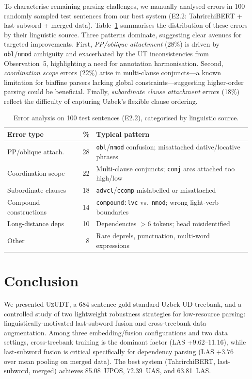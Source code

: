 \documentclass[runningheads]{llncs}
\begin{document}
To characterise remaining parsing challenges, we manually analysed errors in 100 randomly sampled test sentences from our best system (E2.2: TahrirchiBERT + last-subword + merged data). Table~\ref{tab:error_analysis} summarises the distribution of these errors by their linguistic source.
Three patterns dominate, suggesting clear avenues for targeted improvements. First, \emph{PP/oblique attachment} (28\%) is driven by \texttt{obl}/\texttt{nmod} ambiguity and exacerbated by the UT inconsistencies from Observation~5, highlighting a need for annotation harmonisation. Second, \emph{coordination scope} errors (22\%) arise in multi-clause conjuncts—a known limitation for biaffine parsers lacking global constraints—suggesting higher-order parsing could be beneficial. Finally, \emph{subordinate clause attachment} errors (18\%) reflect the difficulty of capturing Uzbek's flexible clause ordering.
\begin{table}[t]
\centering
\small
\caption{Error analysis on 100 test sentences (E2.2), categorised by linguistic source.}
\label{tab:error_analysis}
\begin{tabular}{lrp{6cm}}
\toprule
\textbf{Error type} & \textbf{\%} & \textbf{Typical pattern} \\
\midrule
PP/oblique attach.     & 28 & \texttt{obl}/\texttt{nmod} confusion; misattached dative/locative phrases \\
Coordination scope     & 22 & Multi-clause conjuncts; \texttt{conj} arcs attached too high/low \\
Subordinate clauses    & 18 & \texttt{advcl}/\texttt{ccomp} mislabelled or misattached \\
Compound constructions & 14 & \texttt{compound:lvc} vs.\ \texttt{nmod}; wrong light-verb boundaries \\
Long-distance deps     & 10 & Dependencies $>$6 tokens; head misidentified \\
Other                  &  8 & Rare deprels, punctuation, multi-word expressions \\
\bottomrule
\end{tabular}
\end{table}
\section{Conclusion}
\label{sec:conclusion}

We presented \textsc{UzUDT}, a 684-sentence gold-standard Uzbek UD
treebank, and a controlled study of two lightweight robustness
strategies for low-resource parsing: linguistically-motivated
last-subword fusion and cross-treebank data augmentation.
Among three embedding/fusion configurations and two data settings,
cross-treebank training is the dominant factor (LAS
+9.62--11.16), while last-subword fusion is critical specifically
for dependency parsing (LAS +3.76 over mean pooling on merged data).
The best system (TahrirchiBERT, last-subword, merged) achieves
85.08~UPOS, 72.39~UAS, and 63.81~LAS.
\end{document}
